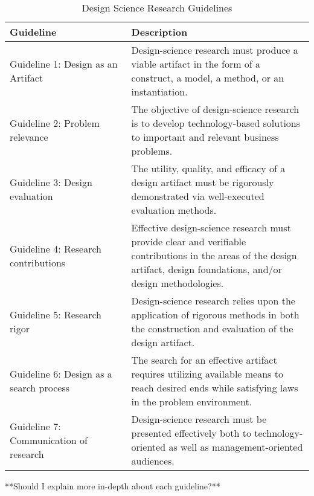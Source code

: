 \documentclass[../Main/thesis.tex]{subfiles}
\begin{document}
\begin{table}[ht]
\centering
\begin{tabular}{|p{0.4\linewidth}|p{0.6\linewidth}|}
	\hline
	\textbf{Guideline} & \textbf{Description} \\ \hline
	Guideline 1: Design as an Artifact & Design-science research must produce a viable artifact in the form of a construct, a model, a method, or an instantiation. \\ \hline
	Guideline 2: Problem relevance & The objective of design-science research is to develop technology-based solutions to important and relevant business problems. \\ \hline
	Guideline 3: Design evaluation & The utility, quality, and efficacy of a design artifact must be rigorously demonstrated via well-executed evaluation methods. \\ \hline
	Guideline 4: Research contributions & Effective design-science research must provide clear and verifiable contributions in the areas of the design artifact, design foundations, and/or design methodologies. \\ \hline
	Guideline 5: Research rigor & Design-science research relies upon the application of rigorous methods in both the construction and evaluation of the design artifact. \\ \hline
	Guideline 6: Design as a search process & The search for an effective artifact requires utilizing available means to reach desired ends while satisfying laws in the problem environment. \\ \hline
	Guideline 7: Communication of research & Design-science research must be presented effectively both to technology-oriented as well as management-oriented audiences. \\ \hline
\end{tabular}
\caption{Design Science Research Guidelines \citep[p.83]{hevner2004design}}
\label{tab:design-science-guidelines}
\end{table}


**Should I explain more in-depth about each guideline?**
\end{document}
